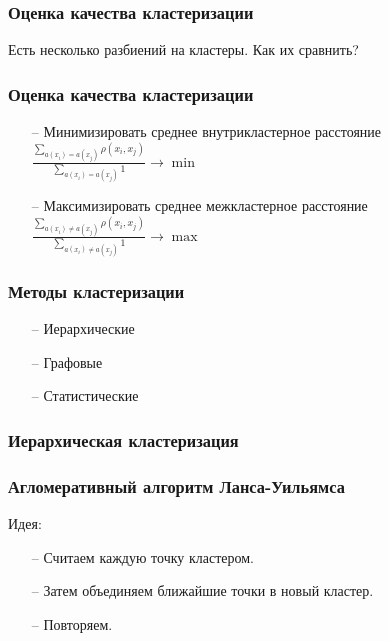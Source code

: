 \documentclass[12pt]{beamer}
\begin{document}
\begin{frame}\frametitle{Оценка качества кластеризации}
Есть несколько разбиений на кластеры. Как их сравнить?
\end{frame}

\begin{frame}\frametitle{Оценка качества кластеризации}
\begin{itemize}
\item[--] Минимизировать среднее внутрикластерное расстояние\\
\vspace{5mm}
${\frac{\sum_{a(x_i) = a(x_j)} \rho(x_i, x_j)}{\sum_{a(x_i) = a(x_j)} 1} \rightarrow \min}$
\item[--] Максимизировать среднее межкластерное расстояние\\
\vspace{5mm}
${\frac{\sum_{a(x_i) \neq a(x_j)} \rho(x_i, x_j)}{\sum_{a(x_i) \neq a(x_j)} 1} \rightarrow \max}$
\end{itemize}
\end{frame}

\begin{frame}\frametitle{Методы кластеризации}
\begin{itemize}
\item[--] Иерархические
\item[--] Графовые 
\item[--] Статистические 
\end{itemize}
\end{frame}

\begin{frame}\frametitle{Иерархическая кластеризация}
\end{frame}

\begin{frame}\frametitle{Агломеративный алгоритм Ланса-Уильямса}
Идея:\\
\begin{itemize}
\item[--] Считаем каждую точку кластером. 
\item[--] Затем объединяем ближайшие точки в новый кластер. 
\item[--] Повторяем.
\end{itemize}
\end{frame}
\end{document}
